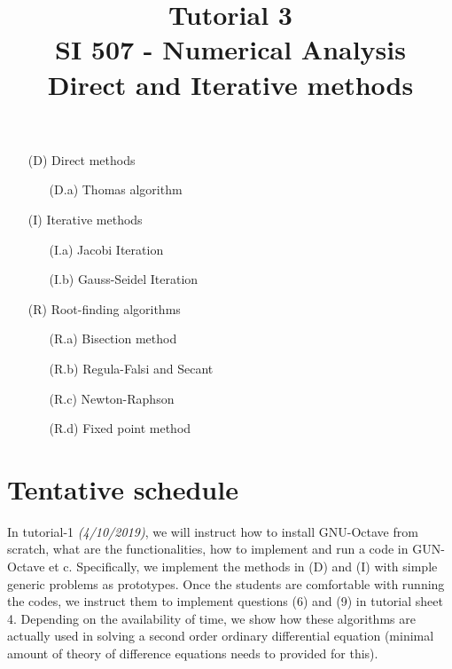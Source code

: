\documentclass[11pt,a4paper,reqno]{article}
\begin{document}
	
	

	\title{Tutorial 3 \\ SI 507 - Numerical Analysis \vspace{0.5cm} \\ \small{\bf Direct and Iterative methods}}
	\author{}
	\maketitle
	\begin{tcolorbox}
		[colback=green!5!white,colframe=cyan!75!black,fonttitle=\bfseries,title=Syllabus]
	\begin{itemize}
		\item[(D)] Direct methods
		\begin{itemize}
			\item[(D.a)] Thomas algorithm
		\end{itemize}
		\item[(I)] Iterative methods
		\begin{itemize}
			\item[(I.a)] Jacobi Iteration
			\item[(I.b)] Gauss-Seidel Iteration 
		\end{itemize}
		\item[(R)] Root-finding algorithms 
		\begin{itemize}
			\item[(R.a)] Bisection method
			\item[(R.b)] Regula-Falsi and Secant
			\item[(R.c)] Newton-Raphson 
			\item[(R.d)] Fixed point method
		\end{itemize}
	\end{itemize}
	\end{tcolorbox}
\section*{Tentative schedule}
In tutorial-1 \emph{(4/10/2019)}, we will instruct how to install GNU-Octave from scratch, what are the functionalities, how to implement and run a code in GUN-Octave et c. Specifically, we implement the methods in (D) and (I) with simple generic problems as prototypes. Once the students are comfortable with running the codes, we instruct them to implement questions (6) and (9) in tutorial sheet 4. Depending on the availability of time, we show how these algorithms are actually used in solving a second order ordinary differential equation (minimal amount of theory of difference equations needs to provided for this).
\end{document}
